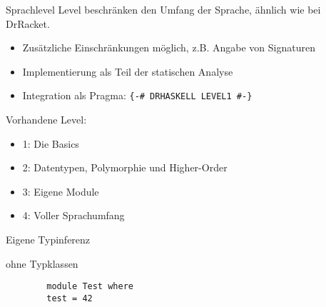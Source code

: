 \begin{frame}{Sprachlevel}
	Level beschränken den Umfang der Sprache, ähnlich wie bei DrRacket.
	\begin{itemize}
		\item Zusätzliche Einschränkungen  möglich, z.B. Angabe von Signaturen
		\item Implementierung als Teil der statischen Analyse
		\item Integration als Pragma: \texttt{\{-\# DRHASKELL LEVEL1 \#-\}}
	\end{itemize}
	Vorhandene Level: \par
	\begin{minipage}[T]{.55 \textwidth}
		\begin{itemize}
			\item 1: Die Basics
			\item 2: Datentypen, Polymorphie und Higher-Order
			\item 3: Eigene Module
			\item 4: Voller Sprachumfang
		\end{itemize}
	\end{minipage}
	\begin{minipage}[T]{.4 \textwidth}
			\scalebox{6}{\}} Eigene Typinferenz \par \hspace{32px} ohne Typklassen
	\end{minipage}
\end{frame}

\begin{frame}[fragile]
	\begin{lstlisting}
		module Test where
		test = 42
	\end{lstlisting}
\end{frame}
